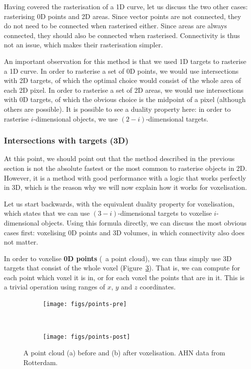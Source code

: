 Having covered the rasterisation of a 1D curve, let us discuss the two other cases: rasterising 0D points and 2D areas.
Since vector points are not connected, they do not need to be connected when rasterised either.
Since areas are always connected, they should also be connected when rasterised.
Connectivity is thus not an issue, which makes their rasterisation simpler.

An important observation for this method is that we used 1D targets to rasterise a 1D curve.
In order to rasterise a set of 0D points, we would use intersections with 2D targets, of which the optimal choice would consist of the whole area of each 2D pixel.
In order to rasterise a set of 2D areas, we would use intersections with 0D targets, of which the obvious choice is the midpoint of a pixel (although others are possible).
It is possible to see a duality property here: in order to rasterise \(i\)-dimensional objects, we use \((2-i)\)-dimensional targets.

\subsubsection*{Intersections with targets (3D)}

At this point, we should point out that the method described in the previous section is not the absolute fastest or the most common to rasterise objects in 2D.
However, it is a method with good performance with a logic that works perfectly in 3D, which is the reason why we will now explain how it works for voxelisation.

Let us start backwards, with the equivalent duality property for voxelisation, which states that we can use \((3-i)\)-dimensional targets to voxelise \(i\)-dimensional objects.
Using this formula directly, we can discuss the most obvious cases first: voxelising 0D points and 3D volumes, in which connectivity also does not matter.

In order to voxelise \textbf{0D points} (\eg\ a point cloud), we can thus simply use 3D targets that consist of the whole voxel (Figure~\ref{fig:points}).
That is, we can compute for each point which voxel it is in, or for each voxel the points that are in it.
This is a trivial operation using ranges of \(x\), \(y\) and \(z\) coordinates.

\begin{figure}
\centering
\begin{subfigure}[b]{\linewidth}
\texttt{[image: figs/points-pre]}
\caption{}%
\label{subfig:points-pre}
\end{subfigure}
\\
\begin{subfigure}[b]{\linewidth}
\texttt{[image: figs/points-post]}
\caption{}%
\label{subfig:points-post}
\end{subfigure}
\caption[A point cloud before and after voxelisation]{A point cloud (a) before and (b) after voxelisation. AHN data from Rotterdam.}%
\label{fig:points}
\end{figure}

